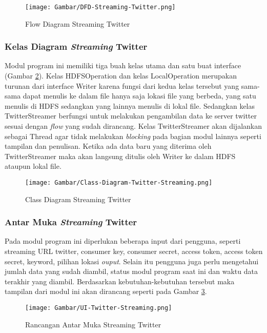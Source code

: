 \begin{figure}[H]
	\centering
	\texttt{[image: Gambar/DFD-Streaming-Twitter.png]}
	\caption[Flow Diagram Streaming Twitter]{Flow Diagram Streaming Twitter} 
	\label{fig:flow_streaming_twitter}
\end{figure}

\subsubsection{Kelas Diagram \textit{Streaming} Twitter}
Modul program ini memiliki tiga buah kelas utama dan satu buat interface (Gambar \ref{fig:class_streaming_twitter}). Kelas HDFSOperation dan kelas LocalOperation merupakan turunan dari interface Writer karena fungsi dari kedua kelas tersebut yang sama-sama dapat menulis ke dalam file hanya saja lokasi file yang berbeda, yang satu menulis di HDFS sedangkan yang lainnya menulis di lokal file. Sedangkan kelas TwitterStreamer berfungsi untuk melakukan pengambilan data ke server twitter sesuai dengan \textit{flow} yang sudah dirancang. Kelas TwitterStreamer akan dijalankan sebagai Thread agar tidak melakukan \textit{blocking} pada bagian modul lainnya seperti tampilan dan penulisan. Ketika ada data baru yang diterima oleh TwitterStreamer maka akan langsung ditulis oleh Writer ke dalam HDFS ataupun lokal file.

\begin{figure}[H]
	\centering
	\texttt{[image: Gambar/Class-Diagram-Twitter-Streaming.png]}
	\caption[Class Diagram Streaming Twitter]{Class Diagram Streaming Twitter} 
	\label{fig:class_streaming_twitter}
\end{figure}

\subsubsection{Antar Muka \textit{Streaming} Twitter}
Pada modul program ini diperlukan beberapa input dari pengguna, seperti streaming URL twitter, consumer key, consumer secret, access token, access token secret, keyword, pilihan lokasi \textit{ouput}. Selain itu pengguna juga perlu mengetahui jumlah data yang sudah diambil, status modul program saat ini dan waktu data terakhir yang diambil. Berdasarkan kebutuhan-kebutuhan tersebut maka tampilan dari modul ini akan dirancang seperti pada Gambar \ref{fig:ui_streaming_twitter}.

\begin{figure}[H]
	\centering
	\texttt{[image: Gambar/UI-Twitter-Streaming.png]}
	\caption[Rancangan Antar Muka Streaming Twitter]{Rancangan Antar Muka Streaming Twitter} 
	\label{fig:ui_streaming_twitter}
\end{figure}

